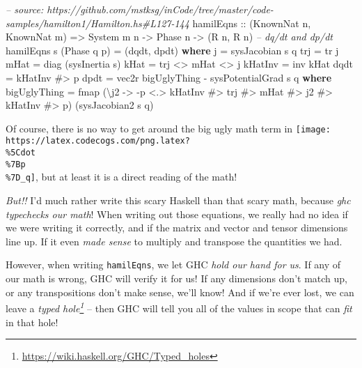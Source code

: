 \documentclass[]{article}
\newenvironment{Shaded}{}{}
\newcommand{\KeywordTok}[1]{\textcolor[rgb]{0.00,0.44,0.13}{\textbf{#1}}}
\newcommand{\DataTypeTok}[1]{\textcolor[rgb]{0.56,0.13,0.00}{#1}}
\newcommand{\CommentTok}[1]{\textcolor[rgb]{0.38,0.63,0.69}{\textit{#1}}}
\newcommand{\OtherTok}[1]{\textcolor[rgb]{0.00,0.44,0.13}{#1}}
\newcommand{\FunctionTok}[1]{\textcolor[rgb]{0.02,0.16,0.49}{#1}}
\newcommand{\NormalTok}[1]{#1}
\renewcommand{\href}[2]{#2\footnote{\url{#1}}}
\begin{document}
\begin{Shaded}
\begin{Highlighting}[]
\CommentTok{-- source: https://github.com/mstksg/inCode/tree/master/code-samples/hamilton1/Hamilton.hs#L127-144}
\NormalTok{hamilEqns}
\OtherTok{    ::}\NormalTok{ (}\DataTypeTok{KnownNat}\NormalTok{ n, }\DataTypeTok{KnownNat}\NormalTok{ m)}
    \OtherTok{=>} \DataTypeTok{System}\NormalTok{ m n}
    \OtherTok{->} \DataTypeTok{Phase}\NormalTok{ n}
    \OtherTok{->}\NormalTok{ (}\DataTypeTok{R}\NormalTok{ n, }\DataTypeTok{R}\NormalTok{ n)       }\CommentTok{-- dq/dt and dp/dt}
\NormalTok{hamilEqns s (}\DataTypeTok{Phase}\NormalTok{ q p) }\FunctionTok{=}\NormalTok{ (dqdt, dpdt)}
  \KeywordTok{where}
\NormalTok{    j       }\FunctionTok{=}\NormalTok{ sysJacobian s q}
\NormalTok{    trj     }\FunctionTok{=}\NormalTok{ tr j}
\NormalTok{    mHat    }\FunctionTok{=}\NormalTok{ diag (sysInertia s)}
\NormalTok{    kHat    }\FunctionTok{=}\NormalTok{ trj }\FunctionTok{<>}\NormalTok{ mHat }\FunctionTok{<>}\NormalTok{ j}
\NormalTok{    kHatInv }\FunctionTok{=}\NormalTok{ inv kHat}
\NormalTok{    dqdt    }\FunctionTok{=}\NormalTok{ kHatInv }\FunctionTok{#>}\NormalTok{ p}
\NormalTok{    dpdt    }\FunctionTok{=}\NormalTok{ vec2r bigUglyThing }\FunctionTok{-}\NormalTok{ sysPotentialGrad s q}
      \KeywordTok{where}
\NormalTok{        bigUglyThing }\FunctionTok{=}
\NormalTok{          fmap (\textbackslash{}j2 }\OtherTok{->} \FunctionTok{-}\NormalTok{p }\FunctionTok{<.>}\NormalTok{ kHatInv }\FunctionTok{#>}\NormalTok{ trj }\FunctionTok{#>}\NormalTok{ mHat }\FunctionTok{#>}\NormalTok{ j2 }\FunctionTok{#>}\NormalTok{ kHatInv }\FunctionTok{#>}\NormalTok{ p)}
\NormalTok{               (sysJacobian2 s q)}
\end{Highlighting}
\end{Shaded}

Of course, there is no way to get around the big ugly math term in
\texttt{[image: https://latex.codecogs.com/png.latex?\\\%5Cdot\\\%7Bp\\\%7D\_q]}, but
at least it is a direct reading of the math!

\emph{But!!} I'd much rather write this scary Haskell than that scary math,
because \emph{ghc typechecks our math}! When writing out those equations, we
really had no idea if we were writing it correctly, and if the matrix and vector
and tensor dimensions line up. If it even \emph{made sense} to multiply and
transpose the quantities we had.

However, when writing \texttt{hamilEqns}, we let GHC \emph{hold our hand for
us}. If any of our math is wrong, GHC will verify it for us! If any dimensions
don't match up, or any transpositions don't make sense, we'll know! And if we're
ever lost, we can leave a
\emph{\href{https://wiki.haskell.org/GHC/Typed_holes}{typed hole}} -- then GHC
will tell you all of the values in scope that can \emph{fit} in that hole!
\end{document}
